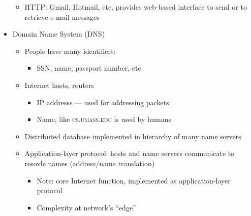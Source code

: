 \begin{itemize}
\begin{itemize}
\begin{itemize}
        \end{itemize}

      \item HTTP: Gmail, Hotmail, etc. provides web-based interface to send or to retrieve e-mail messages

    \end{itemize}

  \item Domain Name System (DNS)

    \begin{itemize}

      \item People have many identifiers:

        \begin{itemize}

          \item SSN, name, passport number, etc.

        \end{itemize}

      \item Internet hosts, routers

        \begin{itemize}

          \item IP addresss — used for addressing packets

          \item Name, like \textsc{cs.umass.edu} is used by humans

        \end{itemize}

      \item Distributed database implemented in hierarchy of many name servers

      \item Application-layer protocol: hosts and name servers communicate to resovle names (address/name translation)

        \begin{itemize}

          \item Note: core Internet function, implemented as application-layer protocol

          \item Complexity at network's ``edge''

        \end{itemize}

    \end{itemize}


\end{itemize}
